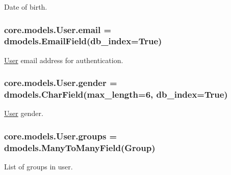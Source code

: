 Date of birth. 

\hypertarget{classcore_1_1models_1_1User_a214f7506978bd5f697a493f1b4f83553}{
\subsubsection[{email}]{\setlength{\rightskip}{0pt plus 5cm}core.\-models.\-User.\-email = dmodels.\-Email\-Field(db\-\_\-index=True)\hspace{0.3cm}{\ttfamily [static]}}}\label{classcore_1_1models_1_1User_a214f7506978bd5f697a493f1b4f83553}


\hyperlink{classcore_1_1models_1_1User}{User} email address for authentication. 

\hypertarget{classcore_1_1models_1_1User_a7dc05b5317795603bcd3ca4dbb5cca8f}{
\subsubsection[{gender}]{\setlength{\rightskip}{0pt plus 5cm}core.\-models.\-User.\-gender = dmodels.\-Char\-Field(max\-\_\-length=6, db\-\_\-index=True)\hspace{0.3cm}{\ttfamily [static]}}}\label{classcore_1_1models_1_1User_a7dc05b5317795603bcd3ca4dbb5cca8f}


\hyperlink{classcore_1_1models_1_1User}{User} gender. 

\hypertarget{classcore_1_1models_1_1User_a17a29647bdff999f6f8ffc3bf744dd10}{
\subsubsection[{groups}]{\setlength{\rightskip}{0pt plus 5cm}core.\-models.\-User.\-groups = dmodels.\-Many\-To\-Many\-Field({\bf Group})\hspace{0.3cm}{\ttfamily [static]}}}\label{classcore_1_1models_1_1User_a17a29647bdff999f6f8ffc3bf744dd10}


List of groups in user. 

